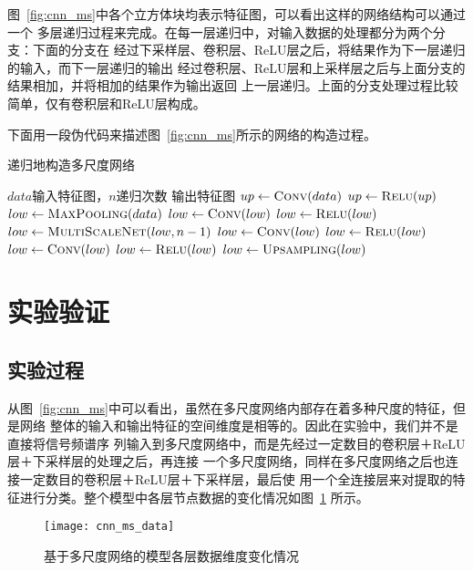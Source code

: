 图~\ref{fig:cnn_ms}中各个立方体块均表示特征图，可以看出这样的网络结构可以通过一个
多层递归过程来完成。在每一层递归中，对输入数据的处理都分为两个分支：下面的分支在
经过下采样层、卷积层、ReLU层之后，将结果作为下一层递归的输入，而下一层递归的输出
经过卷积层、ReLU层和上采样层之后与上面分支的结果相加，并将相加的结果作为输出返回
上一层递归。上面的分支处理过程比较简单，仅有卷积层和ReLU层构成。

下面用一段伪代码来描述图~\ref{fig:cnn_ms}所示的网络的构造过程。

\begin{algorithm}[ht]
    \caption{递归地构造多尺度网络}
    \begin{algorithmic}[1] %
        \Require $data$输入特征图，$n$递归次数
        \Ensure 输出特征图
						\State $up \gets \Call{Conv}{data}$
            \State $up \gets \Call{Relu}{up}$
            \State $low \gets \Call{MaxPooling}{data}$
            \State $low \gets \Call{Conv}{low}$
            \State $low \gets \Call{Relu}{low}$
                \State $low \gets \Call{MultiScaleNet}{low, n-1}$
						\Else
							\State $low \gets \Call{Conv}{low}$
							\State $low \gets \Call{Relu}{low}$
            \EndIf
						\State $low \gets \Call{Conv}{low}$
						\State $low \gets \Call{Relu}{low}$
						\State $low \gets \Call{Upsampling}{low}$
            \State {}
        \EndFunction
    \end{algorithmic}
\end{algorithm}

\section{实验验证}

\subsection{实验过程}

从图~\ref{fig:cnn_ms}中可以看出，虽然在多尺度网络内部存在着多种尺度的特征，但是网络
整体的输入和输出特征的空间维度是相等的。因此在实验中，我们并不是直接将信号频谱序
列输入到多尺度网络中，而是先经过一定数目的卷积层＋ReLU层＋下采样层的处理之后，再连接
一个多尺度网络，同样在多尺度网络之后也连接一定数目的卷积层＋ReLU层＋下采样层，最后使
用一个全连接层来对提取的特征进行分类。整个模型中各层节点数据的变化情况如图~\ref{fig:cnn_ms_data}
所示。
\begin{figure}[ht]
  \centering
  \texttt{[image: cnn\_ms\_data]}
  \caption{基于多尺度网络的模型各层数据维度变化情况}
  \label{fig:cnn_ms_data}
\end{figure}

